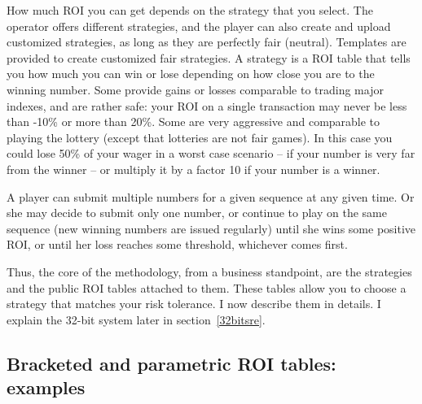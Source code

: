 \documentclass[oneside,10pt]{book}
\begin{document}
How much ROI you can get depends on the strategy that you select. The operator offers different strategies, and the player can  also create and upload customized strategies, as long as they are perfectly fair (neutral). Templates are provided to create customized fair strategies.  A strategy is a ROI table that tells you how much you can win or lose depending on how close you are to the winning number. Some provide gains or losses comparable to trading major indexes, and are rather safe: your ROI on a single transaction may never be less than -10\% or more than 20\%. Some are very aggressive and comparable to playing the lottery (except that lotteries are not fair games). In this case you could lose 50\% of your wager in a worst case scenario -- if your number is very far from the winner -- or multiply it by a factor 10 if your number is a winner.

A player can submit multiple numbers for a given sequence at any given time. Or she may decide to submit only one number, or continue to play on the same sequence (new winning numbers are issued regularly) until she wins some positive ROI, or until her loss reaches some threshold, whichever comes first.

Thus, the core of the methodology, from a business standpoint, are the strategies and the public ROI tables attached to them. These tables allow you to choose a strategy that matches your risk tolerance. I now describe them in details. I
explain the 32-bit system later in section~\ref{32bitsre}.

\subsection{Bracketed and parametric ROI tables: examples}
\end{document}
